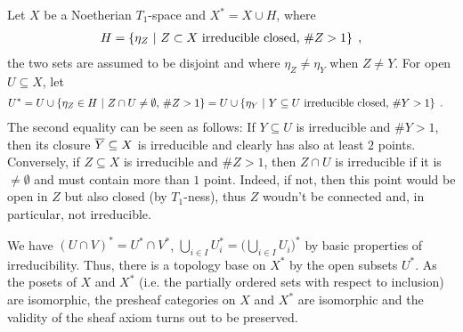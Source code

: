 \documentclass[a4paper,parskip=half,numbers=enddot, DIV=12]{scrreprt}
\begin{document}
Let $X$ be a Noetherian $T_1$-space and $X^* = X\cup H $, where 
\begin{align*}
    H= \left\{\eta_Z\ \middle|\  Z\subset X \text{ irreducible closed, }\#Z> 1\right\}\;,
\end{align*}
the two sets are assumed to be disjoint and where $\eta_Z\neq \eta_Y$ when $Z\neq Y$. For open $U\subseteq X$, let 
\begin{align*}
    U^* &= U \cup \left\{\eta_Z\in H\ \middle|\  Z\cap U \neq \emptyset\text{, }\# Z > 1\right\} = U\cup \left\{\eta_Y \ \middle|\  Y\subseteq U\text{ irreducible closed, }\#Y > 1\right\}\;.
\end{align*}
The second equality can be seen as follows: If $Y\subseteq U$ is irreducible and $\#Y>1$, then its closure $\overline Y\subseteq X$ is irreducible and clearly has also at least $2$ points. Conversely, if $Z\subseteq X$ is irreducible and $\# Z>1$, then $Z\cap U$ is irreducible if it is $\neq\emptyset$ and must contain more than $1$ point. Indeed, if not, then this point would be open in $Z$ but also closed (by $T_1$-ness), thus $Z$ woudn't be connected and, in particular, not irreducible.

We have $(U\cap V)^* = U^* \cap V^*$, $\bigcup_{i\in I} U_i^* = \big(\bigcup_{i\in I} U_i\big)^*$ by basic properties of irreducibility. Thus, there is a topology base on $X^*$ by the open subsets $U^*$. As the posets of $X$ and $X^*$ (i.e. the partially ordered sets with respect to inclusion) are isomorphic, the presheaf categories on $X$ and $X^*$ are isomorphic and the validity of the sheaf axiom turns out to be preserved. 
\end{document}
